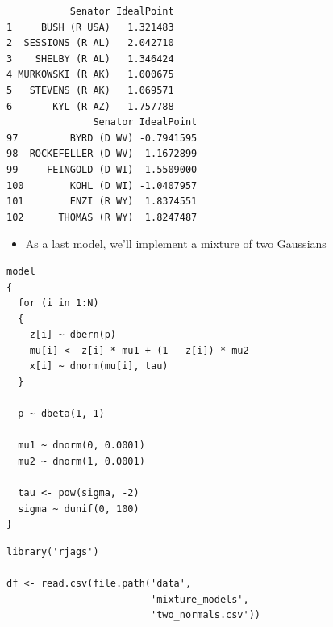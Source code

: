 \documentclass{beamer}
\begin{document}
\begin{frame}[fragile]
  \begin{verbatim}
           Senator IdealPoint
1     BUSH (R USA)   1.321483
2  SESSIONS (R AL)   2.042710
3    SHELBY (R AL)   1.346424
4 MURKOWSKI (R AK)   1.000675
5   STEVENS (R AK)   1.069571
6       KYL (R AZ)   1.757788
               Senator IdealPoint
97         BYRD (D WV) -0.7941595
98  ROCKEFELLER (D WV) -1.1672899
99     FEINGOLD (D WI) -1.5509000
100        KOHL (D WI) -1.0407957
101        ENZI (R WY)  1.8374551
102      THOMAS (R WY)  1.8247487
  \end{verbatim}
\end{frame}

\begin{frame}[fragile]
  \begin{itemize}
    \item{As a last model, we'll implement a mixture of two Gaussians}
  \end{itemize}
\end{frame}

\begin{frame}[fragile]
  \begin{verbatim}
model
{
  for (i in 1:N)
  {
    z[i] ~ dbern(p)
    mu[i] <- z[i] * mu1 + (1 - z[i]) * mu2
    x[i] ~ dnorm(mu[i], tau)
  }
  
  p ~ dbeta(1, 1)
  
  mu1 ~ dnorm(0, 0.0001)
  mu2 ~ dnorm(1, 0.0001)
  
  tau <- pow(sigma, -2)
  sigma ~ dunif(0, 100)
}
  \end{verbatim}
\end{frame}

\begin{frame}[fragile]
  \begin{verbatim}
library('rjags')

df <- read.csv(file.path('data',
                         'mixture_models',
                         'two_normals.csv'))
  \end{verbatim}
\end{frame}
\end{document}
